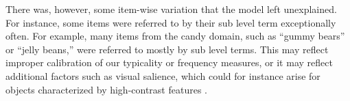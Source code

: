 \documentclass[10pt,letterpaper]{article}
\begin{document}


There was, however, some item-wise variation that the model left unexplained. For instance, some items were referred to by their sub level term exceptionally often. For example, many items from the candy domain, such as ``gummy bears'' or ``jelly beans,'' were referred to mostly by sub level terms.
This may reflect improper calibration of our typicality or frequency measures, or it may reflect additional factors such as visual salience, which could for instance arise for objects characterized by high-contrast features \cite{Westerbeek2015}.

\end{document}

